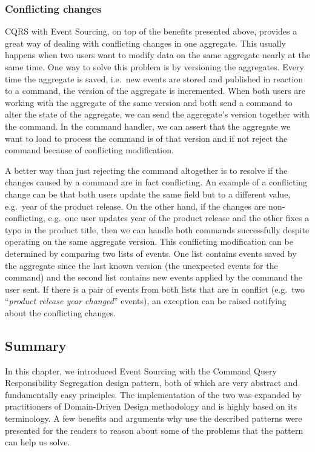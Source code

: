 \documentclass{book}
\begin{document}
\subsubsection{Conflicting changes}\label{conflicting-changes}

CQRS with Event Sourcing, on top of the benefits presented above,
provides a great way of dealing with conflicting changes in one
aggregate. This usually happens when two users want to modify data on
the same aggregate nearly at the same time. One way to solve this
problem is by versioning the aggregates. Every time the aggregate is
saved, i.e.~new events are stored and published in reaction to a
command, the version of the aggregate is incremented. When both users
are working with the aggregate of the same version and both send a
command to alter the state of the aggregate, we can send the aggregate's
version together with the command. In the command handler, we can assert
that the aggregate we want to load to process the command is of that
version and if not reject the command because of conflicting
modification.

A better way than just rejecting the command altogether is to resolve if
the changes caused by a command are in fact conflicting. An example of a
conflicting change can be that both users update the same field but to a
different value, e.g.~year of the product release. On the other hand, if
the changes are non-conflicting, e.g.~one user updates year of the
product release and the other fixes a typo in the product title, then we
can handle both commands successfully despite operating on the same
aggregate version. This conflicting modification can be determined by
comparing two lists of events. One list contains events saved by the
aggregate since the last known version (the unexpected events for the
command) and the second list contains new events applied by the command
the user sent. If there is a pair of events from both lists that are in
conflict (e.g.~two ``\emph{product release year changed}'' events), an
exception can be raised notifying about the conflicting changes.


\subsection{Summary}\label{summary}

In this chapter, we introduced Event Sourcing with the Command Query
Responsibility Segregation design pattern, both of which are very
abstract and fundamentally easy principles. The implementation of the
two was expanded by practitioners of Domain-Driven Design methodology
and is highly based on its terminology. A few benefits and arguments why
use the described patterns were presented for the readers to reason
about some of the problems that the pattern can help us solve.
\end{document}
